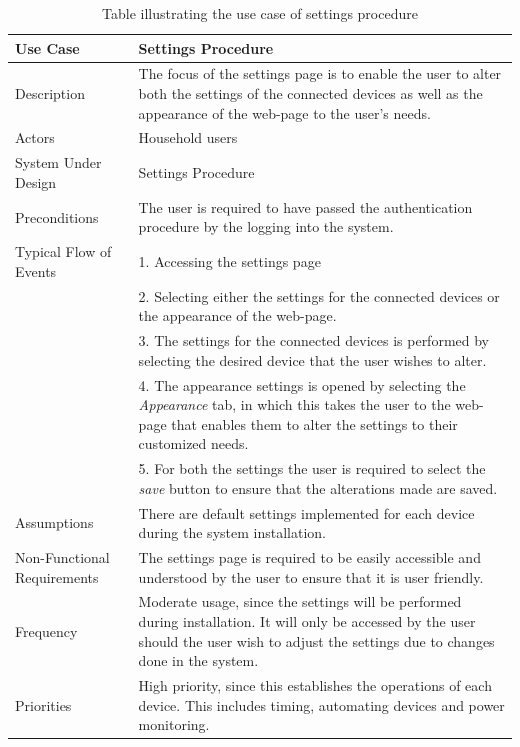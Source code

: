 \documentclass[10pt,twocolumn]{witseiepaper}
\begin{document}
	\begin{table}[H]
		\centering
		\caption{Table illustrating the use case of settings procedure}
		\label{settings_use_case}
		\begin{tabular}{| p{22mm} | p{50mm} |}
			\hline
			\textbf{Use Case} & \textbf{Settings Procedure} \\
			\hline 
			Description & The focus of the settings page is to enable the user to alter both the settings of the connected devices as well as the appearance of the web-page to the user's needs.\\
			\hline
			Actors & Household users \\
			\hline
			System Under Design & Settings Procedure \\
			\hline
			Preconditions & The user is required to have passed the authentication procedure by the logging into the system.\\
			\hline
			Typical Flow of Events & 1. Accessing the settings page \\
			& 2. Selecting either the settings for the connected devices or the appearance of the web-page. \\
			& 3. The settings for the connected devices is performed by selecting the desired device that the user wishes to alter. \\
			& 4. The appearance settings is opened by selecting the \textit{Appearance} tab, in which this takes the user to the web-page that enables them to alter the settings to their customized needs.\\
			& 5. For both the settings the user is required to select the \textit{save} button to ensure that the alterations made are saved.\\
			\hline
			Assumptions & There are default settings implemented for each device during the system installation.\\
			\hline
			Non-Functional Requirements & The settings page is required to be easily accessible and understood by the user to ensure that it is user friendly.\\
			\hline
			Frequency & Moderate usage, since the settings will be performed during installation. It will only be accessed by the user should the user wish to adjust the settings due to changes done in the system. \\
			\hline
			Priorities & High priority, since this establishes the operations of each device. This includes timing, automating devices and power monitoring.\\
			\hline
		\end{tabular}
	\end{table}
\end{document}
